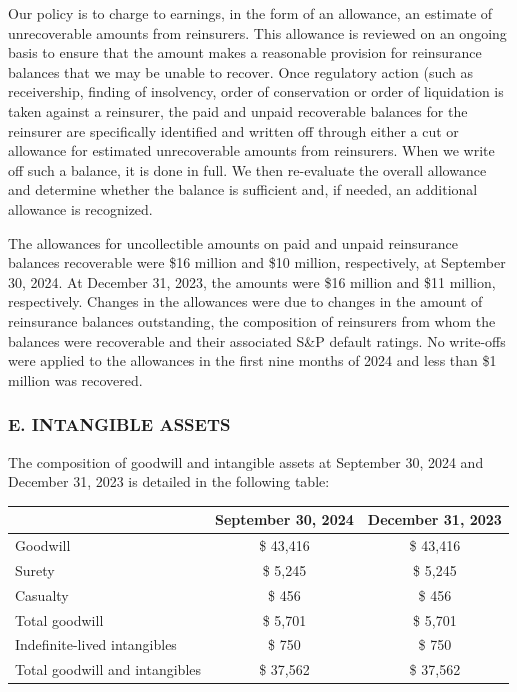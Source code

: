 \documentclass{article}
\begin{document}
Our policy is to charge to earnings, in the form of an allowance, an estimate of unrecoverable amounts from reinsurers. This allowance is reviewed on an ongoing basis to ensure that the amount makes a reasonable provision for reinsurance balances that we may be unable to recover. Once regulatory action (such as receivership, finding of insolvency, order of conservation or order of liquidation is taken against a reinsurer, the paid and unpaid recoverable balances for the reinsurer are specifically identified and written off through either a cut or allowance for estimated unrecoverable amounts from reinsurers. When we write off such a balance, it is done in full. We then re-evaluate the overall allowance and determine whether the balance is sufficient and, if needed, an additional allowance is recognized.

The allowances for uncollectible amounts on paid and unpaid reinsurance balances recoverable were \$16 million and \$10 million, respectively, at September 30, 2024. At December 31, 2023, the amounts were \$16 million and \$11 million, respectively. Changes in the allowances were due to changes in the amount of reinsurance balances outstanding, the composition of reinsurers from whom the balances were recoverable and their associated S\&P default ratings. No write-offs were applied to the allowances in the first nine months of 2024 and less than \$1 million was recovered.

\subsubsection*{E. INTANGIBLE ASSETS}
The composition of goodwill and intangible assets at September 30, 2024 and December 31, 2023 is detailed in the following table:

\begin{table}[h!]
\centering
\begin{tabular}{lcc}
& September 30, 2024 & December 31, 2023 \\
\hline
Goodwill & \$ 43,416 & \$ 43,416 \\
\hline
Surety & \$ 5,245 & \$ 5,245 \\
Casualty & \$ 456 & \$ 456 \\
Total goodwill & \$ 5,701 & \$ 5,701 \\
\hline
Indefinite-lived intangibles & \$ 750 & \$ 750 \\
Total goodwill and intangibles & \$ 37,562 & \$ 37,562 \\
\end{tabular}
\end{table}
\end{document}

